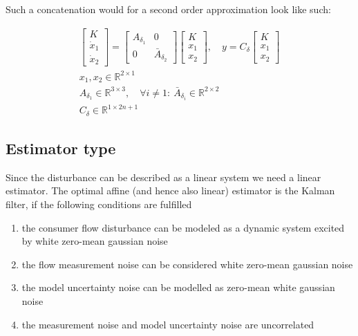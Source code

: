 Such a concatenation would for a second order approximation look like such:

\begin{equation}\label{eq:DisturbanceVectorCase}
	\begin{gathered}
		\begin{bmatrix} K \\ \dot{x}_1 \\ \dot{x}_2 \end{bmatrix} = \begin{bmatrix} A_{\delta_1} & 0 \\ 0 & \bar{A}_{\delta_2} \end{bmatrix} \begin{bmatrix} K \\ x_1 \\ x_2 \end{bmatrix},
		\quad y = C_\delta \begin{bmatrix} K \\ x_1 \\ x_2 \end{bmatrix} \\
		x_1, x_2 \in \mathbb{R}^{2\times1} \\
		A_{\delta_1} \in \mathbb{R}^{3\times3}, \quad \forall i \neq 1: \ \bar{A}_{\delta_i} \in \mathbb{R}^{2\times2} \\
		C_\delta \in \mathbb{R}^{1\times2n+1}
	\end{gathered}
\end{equation}

\subsection{Estimator type}
Since the disturbance can be described as a linear system we need a linear estimator. The optimal affine (and hence also linear) estimator is the Kalman filter, if the following conditions are fulfilled

\begin{enumerate}
	\item the consumer flow disturbance can be modeled as a dynamic system excited by white zero-mean gaussian noise
	\item the flow measurement noise can be considered white zero-mean gaussian noise
	\item the model uncertainty noise can be modelled as zero-mean white gaussian noise
	\item the measurement noise and model uncertainty noise are uncorrelated
\end{enumerate}

